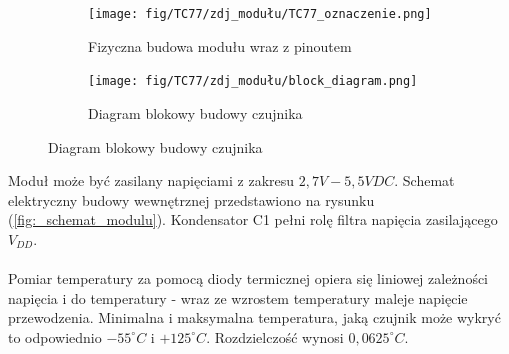 \documentclass[11pt, a4paper]{article}
\begin{document}
\vspace{0.25cm}
\begin{figure}[h]
\centering
\begin{subfigure}{.5\textwidth}
\centering
\texttt{[image: fig/TC77/zdj\_modułu/TC77\_oznaczenie.png]}
\caption{Fizyczna budowa modułu wraz z pinoutem}
\label{fig:_zdjecie_elementu}
\end{subfigure}%
\begin{subfigure}{.5\textwidth}
\centering
\texttt{[image: fig/TC77/zdj\_modułu/block\_diagram.png]}
\caption{Diagram blokowy budowy czujnika \cite{microchip:TC77}}
\label{fig:_zasada_dzialania_elementu}
\end{subfigure}
\label{fig:element}
\end{figure}
\vspace{0.25cm}
Moduł może być zasilany napięciami z zakresu $2,7V - 5,5V DC$. Schemat elektryczny budowy wewnętrznej przedstawiono na rysunku (\ref{fig:_schemat_modulu}). Kondensator C1 pełni rolę filtra napięcia zasilającego $V_{DD}$. \\ \\
Pomiar temperatury za pomocą diody termicznej opiera się liniowej zależności napięcia i do temperatury - wraz ze wzrostem temperatury maleje napięcie przewodzenia. Minimalna i maksymalna temperatura, jaką czujnik może wykryć to odpowiednio $-55 ^\circ C$ i $+125 ^\circ C$. Rozdzielczość wynosi $0,0625 ^\circ C$.
\end{document}

